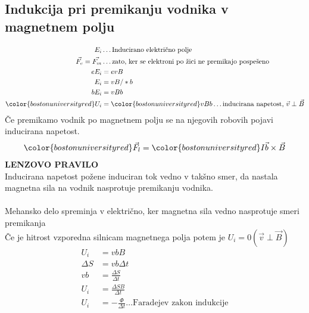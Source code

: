 {\color{indiagreen}\subsection{Indukcija pri premikanju vodnika v magnetnem polju}}
\begin{align*}
	E_i &\dots \text{Inducirano električno polje}\\
	\vec{F_e} = \vec{F_m} &\dots \text{zato, ker se elektroni po žici ne premikajo pospešeno}\\
	eE_i &= evB\\
	E_i &= vB /*b\\
	bE_i &= vBb\\
	{\color{bostonuniversityred}U_i} &= {\color{bostonuniversityred}vBb} \dots \text{inducirana napetost, $\vec{v} \perp \vec{B}$}\\
\end{align*}
Če premikamo vodnik po magnetnem polju se na njegovih robovih pojavi inducirana napetost.\\
\begin{align*}
	{\color{bostonuniversityred}\vec{F_{l}}} &= {\color{bostonuniversityred}I \vec{b} \times \vec{B}}\\
\end{align*}
\textbf{LENZOVO PRAVILO}\\
Inducirana napetost požene induciran tok vedno v takšno smer, da nastala magnetna sila na vodnik nasprotuje premikanju vodnika.\\
\\
Mehansko delo spreminja v električno, ker magnetna sila vedno nasprotuje smeri premikanja\\
Če je hitrost vzporedna silnicam magnetnega polja potem je $U_i = 0(\vec{v} \perp \vec{B})$\\
\begin{align*}
	U_i &= vbB\\
	\Delta S &= vb\Delta t\\
	vb &= \frac{\Delta S}{\Delta t}\\
	U_i &= \frac{\Delta SB}{\Delta t}\\
	U_i &= -\frac{\Phi}{\Delta t}\dots \text{Faradejev zakon indukcije}\\
\end{align*}
